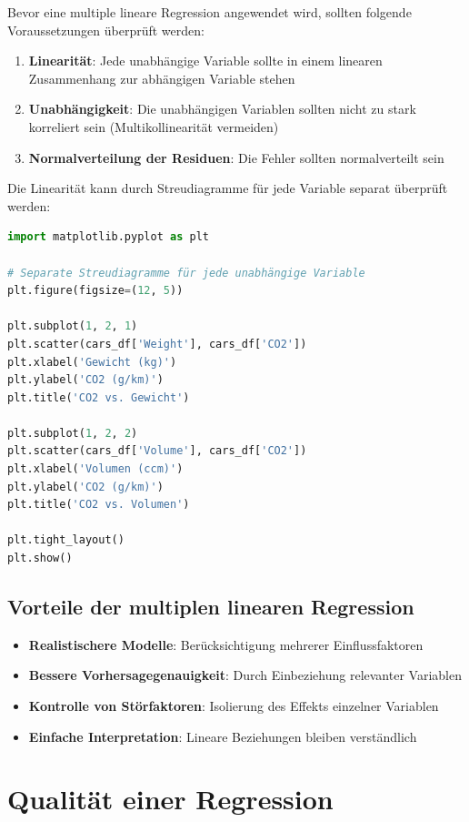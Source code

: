 Bevor eine multiple lineare Regression angewendet wird, sollten folgende Voraussetzungen überprüft werden:

\begin{enumerate}
    \item \textbf{Linearität}: Jede unabhängige Variable sollte in einem linearen Zusammenhang zur abhängigen Variable stehen
    \item \textbf{Unabhängigkeit}: Die unabhängigen Variablen sollten nicht zu stark korreliert sein (Multikollinearität vermeiden)
    \item \textbf{Normalverteilung der Residuen}: Die Fehler sollten normalverteilt sein
\end{enumerate}

Die Linearität kann durch Streudiagramme für jede Variable separat überprüft werden:

\begin{lstlisting}[language=Python]
import matplotlib.pyplot as plt

# Separate Streudiagramme für jede unabhängige Variable
plt.figure(figsize=(12, 5))

plt.subplot(1, 2, 1)
plt.scatter(cars_df['Weight'], cars_df['CO2'])
plt.xlabel('Gewicht (kg)')
plt.ylabel('CO2 (g/km)')
plt.title('CO2 vs. Gewicht')

plt.subplot(1, 2, 2)
plt.scatter(cars_df['Volume'], cars_df['CO2'])
plt.xlabel('Volumen (ccm)')
plt.ylabel('CO2 (g/km)')
plt.title('CO2 vs. Volumen')

plt.tight_layout()
plt.show()
\end{lstlisting}

\subsection{Vorteile der multiplen linearen Regression}

\begin{itemize}
    \item \textbf{Realistischere Modelle}: Berücksichtigung mehrerer Einflussfaktoren
    \item \textbf{Bessere Vorhersagegenauigkeit}: Durch Einbeziehung relevanter Variablen
    \item \textbf{Kontrolle von Störfaktoren}: Isolierung des Effekts einzelner Variablen
    \item \textbf{Einfache Interpretation}: Lineare Beziehungen bleiben verständlich
\end{itemize}

\section{Qualität einer Regression}

